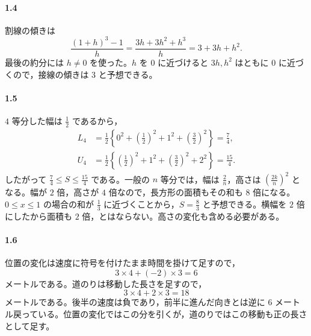 \paragraph{1.4}
割線の傾きは
\[
 \frac{(1+h)^3-1}{h}
 =\frac{3h+3h^2+h^3}{h}
 =3+3h+h^2.
\]
最後の約分には $h\ne0$ を使った。$h$ を $0$ に近づけると $3h,h^2$ はともに $0$ に近づくので，接線の傾きは $3$ と予想できる。

\paragraph{1.5}
$4$ 等分した幅は $\frac12$ であるから，
\begin{align*}
 L_4&=\frac12\left\{0^2+\left(\frac12\right)^2+1^2+\left(\frac32\right)^2\right\}=\frac74,\\
 U_4&=\frac12\left\{\left(\frac12\right)^2+1^2+\left(\frac32\right)^2+2^2\right\}=\frac{15}{4}.
\end{align*}
したがって $\frac74\le S\le\frac{15}{4}$ である。一般の $n$ 等分では，幅は $\frac2n$，高さは $\left(\frac{2k}{n}\right)^2$ となる。幅が $2$ 倍，高さが $4$ 倍なので，長方形の面積もその和も $8$ 倍になる。$0\le x\le1$ の場合の和が $\frac13$ に近づくことから，$S=\frac83$ と予想できる。横幅を $2$ 倍にしたから面積も $2$ 倍，とはならない。高さの変化も含める必要がある。

\paragraph{1.6}
位置の変化は速度に符号を付けたまま時間を掛けて足すので，
\[
 3\times4+(-2)\times3=6
\]
メートルである。道のりは移動した長さを足すので，
\[
 3\times4+2\times3=18
\]
メートルである。後半の速度は負であり，前半に進んだ向きとは逆に $6$ メートル戻っている。位置の変化ではこの分を引くが，道のりではこの移動も正の長さとして足す。
